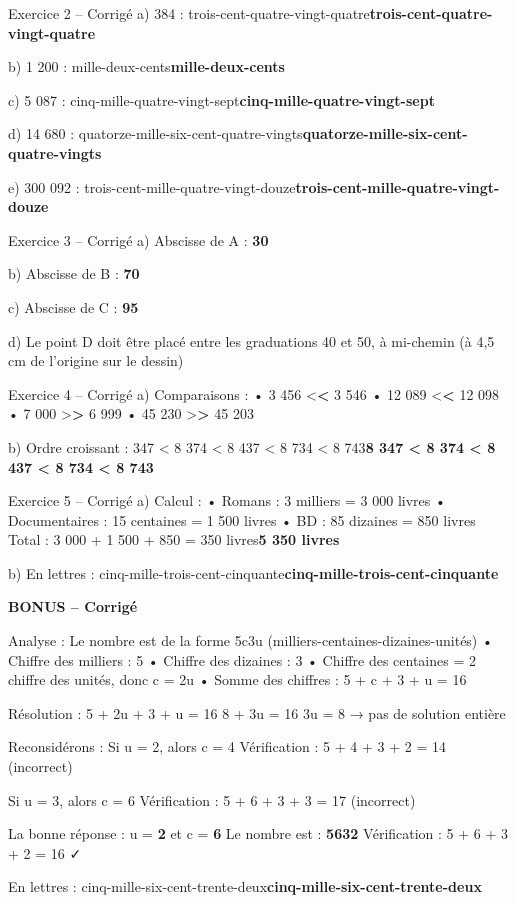 \documentclass[11pt,a4paper]{article}
\DeclareRobustCommand{\rep}[1]{\begingroup\color{warning}\ifmmode #1\else \textbf{#1}\fi\endgroup}
\begin{document}
	\begin{exercisebox}{ Exercice 2 – Corrigé}
		a) 384 : \rep{trois-cent-quatre-vingt-quatre}
		
		b) 1 200 : \rep{mille-deux-cents}
		
		c) 5 087 : \rep{cinq-mille-quatre-vingt-sept}
		
		d) 14 680 : \rep{quatorze-mille-six-cent-quatre-vingts}
		
		e) 300 092 : \rep{trois-cent-mille-quatre-vingt-douze}
	\end{exercisebox}
	
	\begin{exercisebox}{ Exercice 3 – Corrigé}
		a) Abscisse de A : \rep{30}
		
		b) Abscisse de B : \rep{70}
		
		c) Abscisse de C : \rep{95}
		
		d) Le point D doit être placé entre les graduations 40 et 50, à mi-chemin (à 4,5 cm de l'origine sur le dessin)
	\end{exercisebox}
	
	\begin{exercisebox}{ Exercice 4 – Corrigé}
		a) Comparaisons :
		• 3 456 \rep{<} 3 546
		• 12 089 \rep{<} 12 098
		• 7 000 \rep{>} 6 999
		• 45 230 \rep{>} 45 203
		
		b) Ordre croissant : \rep{8 347 < 8 374 < 8 437 < 8 734 < 8 743}
	\end{exercisebox}
	
	\begin{exercisebox}{ Exercice 5 – Corrigé}
		a) Calcul :
		• Romans : 3 milliers = 3 000 livres
		• Documentaires : 15 centaines = 1 500 livres
		• BD : 85 dizaines = 850 livres
		Total : 3 000 + 1 500 + 850 = \rep{5 350 livres}
		
		b) En lettres : \rep{cinq-mille-trois-cent-cinquante}
	\end{exercisebox}
	
	\begin{tcolorbox}[colback=accent!10,colframe=accent]
		\textbf{BONUS – Corrigé}
		
		Analyse : Le nombre est de la forme 5c3u (milliers-centaines-dizaines-unités)
		• Chiffre des milliers : 5
		• Chiffre des dizaines : 3  
		• Chiffre des centaines = 2 \times chiffre des unités, donc c = 2u
		• Somme des chiffres : 5 + c + 3 + u = 16
		
		Résolution : 5 + 2u + 3 + u = 16
		8 + 3u = 16
		3u = 8 → pas de solution entière
		
		Reconsidérons : Si u = 2, alors c = 4
		Vérification : 5 + 4 + 3 + 2 = 14 (incorrect)
		
		Si u = 3, alors c = 6
		Vérification : 5 + 6 + 3 + 3 = 17 (incorrect)
		
		La bonne réponse : u = \rep{2} et c = \rep{6}
		Le nombre est : \rep{5632}
		Vérification : 5 + 6 + 3 + 2 = 16 ✓
		
		En lettres : \rep{cinq-mille-six-cent-trente-deux}
	\end{tcolorbox}
	
\end{document}

